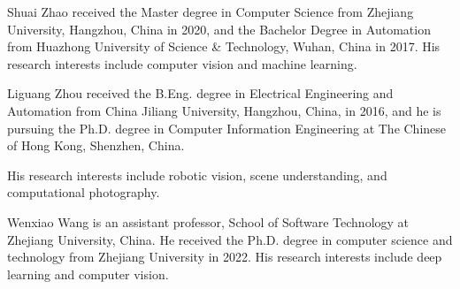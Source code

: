 \documentclass[lettersize,journal]{IEEEtran}
\begin{document}





\begin{IEEEbiography}
	{Shuai Zhao}
received the Master degree in Computer
Science from Zhejiang University, Hangzhou, China in 2020,
and the Bachelor Degree in Automation from Huazhong University of Science \& Technology,
Wuhan, China in 2017.
His research interests include computer vision and machine learning.
\end{IEEEbiography}
\begin{IEEEbiography}
	{Liguang Zhou}
received the B.Eng. degree in Electrical Engineering and Automation from China Jiliang University, Hangzhou, China,
in 2016, and he is pursuing the Ph.D. degree in Computer Information Engineering at The Chinese of Hong Kong, Shenzhen, China.

His research interests include robotic vision, scene understanding, and computational photography.
\end{IEEEbiography}
\begin{IEEEbiography}
	{Wenxiao Wang}
is an assistant professor, School of Software Technology at Zhejiang University, China. He received the Ph.D. degree in computer science and technology from Zhejiang University in 2022. His research interests include deep learning and computer vision.
\end{IEEEbiography}
\end{document}

